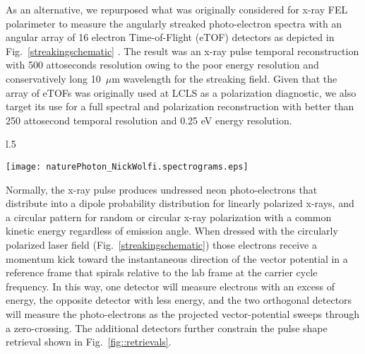 As an alternative, we repurposed what was originally considered for x-ray FEL polarimeter \cite{Markus2014,Allaria2014,Mazza2014,Lutman2016} to measure the angularly streaked photo-electron spectra with an angular array of 16 electron Time-of-Flight (eTOF) detectors as depicted in Fig.~\ref{streakingschematic} \cite{Nick2018}.
The result was an x-ray pulse temporal reconstruction with 500 attoseconds resolution owing to the poor energy resolution and conservatively long 10~$\mu$m wavelength for the streaking field. 
Given that the array of eTOFs was originally used at LCLS as a polarization diagnostic, we also target its use for a full spectral and polarization reconstruction with better than 250 attosecond temporal resolution and 0.25 eV energy resolution.

\begin{wrapfigure}[18]{l}{.5\linewidth}
\vspace{-\baselineskip}
\centerline{\texttt{[image: naturePhoton\_NickWolfi.spectrograms.eps]}}
\vspace{-1\baselineskip}
\caption{\label{fig::retrievals}X-ray pulse shape retrievals reproduced from Ref.~\cite{Nick2018}.}
\end{wrapfigure}
Normally, the x-ray pulse produces undressed neon photo-electrons that distribute into a dipole probability distribution for linearly polarized x-rays, and a circular pattern for random or circular x-ray polarization with a common kinetic energy regardless of emission angle.
When dressed with the circularly polarized laser field (Fig.~\ref{streakingschematic}) those electrons receive a momentum kick toward the instantaneous direction of the vector potential in a reference frame that spirals relative to the lab frame at the carrier cycle frequency.
In this way, one detector will measure electrons with an excess of energy, the opposite detector with less energy, and the two orthogonal detectors will measure the photo-electrons as the projected vector-potential sweeps through a zero-crossing.
The additional detectors further constrain the pulse shape retrieval shown in Fig.~\ref{fig::retrievals}.

